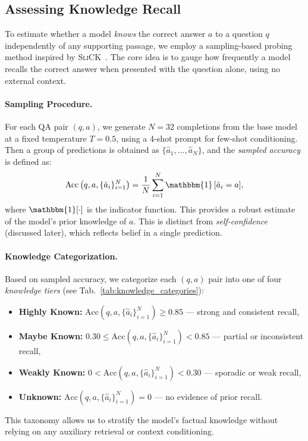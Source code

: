\documentclass[11pt]{article}
\begin{document}
\subsection{Assessing Knowledge Recall}
\label{sec:knowledge}

To estimate whether a model \emph{knows} the correct answer \(a\) to a question \(q\) independently of any supporting passage, we employ a sampling-based probing method inspired by \textsc{SliCK}~\citep{gekhman2024does}. The core idea is to gauge how frequently a model recalls the correct answer when presented with the question alone, using no external context.

\paragraph{Sampling Procedure.}  
For each QA pair \((q, a)\), we generate $N=32$ completions from the base model at a fixed temperature \(T = 0.5\), using a 4-shot prompt for few-shot conditioning. Then a group of predictions is obtained as $\{\hat{a}_1, ..., \hat{a}_N\}$, and the \textit{sampled accuracy} is defined as:
\[
\mathrm{Acc}\left(q, a, \{\hat{a}_i\}_{i=1}^N\right) = \frac{1}{N} \sum_{i=1}^N \mathbbm{1} \, [\hat{a}_i = a],
\]
where \(\mathbbm{1}[\cdot]\) is the indicator function. This provides a robust estimate of the model’s prior knowledge of \(a\). This is distinct from \emph{self-confidence} (discussed later), which reflects belief in a single prediction.

\paragraph{Knowledge Categorization.}  
Based on sampled accuracy, we categorize each \((q, a)\) pair into one of four \textit{knowledge tiers}  (see Tab.~\ref{tab:knowledge_categories}):
\begin{itemize}[leftmargin=*]
    \item \textbf{Highly Known:} \(\mathrm{Acc}\left(q, a, \{\hat{a}_i\}_{i=1}^N\right)  \ge 0.85\) — strong and consistent recall,
    \item \textbf{Maybe Known:} \(0.30 \le \mathrm{Acc}\left(q, a, \{\hat{a}_i\}_{i=1}^N\right)  < 0.85\) — partial or inconsistent recall,
    \item \textbf{Weakly Known:} \(0 < \mathrm{Acc}\left(q, a, \{\hat{a}_i\}_{i=1}^N\right)  < 0.30\) — sporadic or weak recall,
    \item \textbf{Unknown:} \(\mathrm{Acc}\left(q, a, \{\hat{a}_i\}_{i=1}^N\right)  = 0\) — no evidence of prior recall.
\end{itemize}
This taxonomy allows us to stratify the model’s factual knowledge without relying on any auxiliary retrieval or context conditioning.
\end{document}
